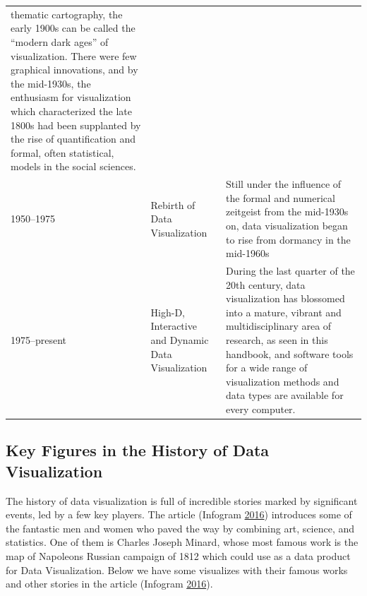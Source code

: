 \documentclass[]{book}
\begin{document}
\begin{longtable}[]{@{}lll@{}}
\begin{minipage}[t]{0.68\columnwidth}
thematic cartography, the early 1900s can be called the ``modern dark
ages'' of visualization. There were few graphical innovations, and by
the mid-1930s, the enthusiasm for visualization which characterized the
late 1800s had been supplanted by the rise of quantification and formal,
often statistical, models in the social sciences.\strut
\end{minipage}\tabularnewline
\begin{minipage}[t]{0.12\columnwidth}\raggedright\strut
1950--1975\strut
\end{minipage} & \begin{minipage}[t]{0.11\columnwidth}\raggedright\strut
Rebirth of Data Visualization\strut
\end{minipage} & \begin{minipage}[t]{0.68\columnwidth}\raggedright\strut
Still under the influence of the formal and numerical zeitgeist from the
mid-1930s on, data visualization began to rise from dormancy in the
mid-1960s\strut
\end{minipage}\tabularnewline
\begin{minipage}[t]{0.12\columnwidth}\raggedright\strut
1975--present\strut
\end{minipage} & \begin{minipage}[t]{0.11\columnwidth}\raggedright\strut
High-D, Interactive and Dynamic Data Visualization\strut
\end{minipage} & \begin{minipage}[t]{0.68\columnwidth}\raggedright\strut
During the last quarter of the 20th century, data visualization has
blossomed into a mature, vibrant and multidisciplinary area of research,
as seen in this handbook, and software tools for a wide range of
visualization methods and data types are available for every
computer.\strut
\end{minipage}\tabularnewline
\bottomrule
\end{longtable}

\subsection{Key Figures in the History of Data
Visualization}\label{key-figures-in-the-history-of-data-visualization}

The history of data visualization is full of incredible stories marked
by significant events, led by a few key players. The article (Infogram
\protect\hyperlink{ref-history_viz}{2016}) introduces some of the
fantastic men and women who paved the way by combining art, science, and
statistics. One of them is Charles Joseph Minard, whose most famous work
is the map of Napoleons Russian campaign of 1812 which could use as a
data product for Data Visualization. Below we have some visualizes with
their famous works and other stories in the article (Infogram
\protect\hyperlink{ref-history_viz}{2016}).
\end{document}
